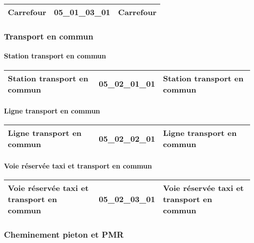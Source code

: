 \documentclass[12pt,titlepage]{book}
\begin{document}
\renewcommand{\arraystretch}{1.2}
\begin{supertabular}{|p{10cm}|c|p{15cm}|}
 Carrefour & 05\_01\_03\_01 & Carrefour\\
\hline
\end{supertabular}

\subsubsection{\large Transport en commun}
\paragraph{Station transport en commun}
\noindent
\vspace{\baselineskip}

\renewcommand{\arraystretch}{1.2}
\begin{supertabular}{|p{10cm}|c|p{15cm}|}
 Station transport en commun & 05\_02\_01\_01 & Station transport en commun\\
\hline
\end{supertabular}


\paragraph{Ligne transport en commun}
\noindent
\vspace{\baselineskip}

\renewcommand{\arraystretch}{1.2}
\begin{supertabular}{|p{10cm}|c|p{15cm}|}
 Ligne transport en commun & 05\_02\_02\_01 & Ligne transport en commun\\
\hline
\end{supertabular}


\paragraph{Voie réservée taxi et transport en commun}
\noindent
\vspace{\baselineskip}

\renewcommand{\arraystretch}{1.2}
\begin{supertabular}{|p{10cm}|c|p{15cm}|}
 Voie réservée taxi et transport en commun & 05\_02\_03\_01 & Voie réservée taxi et transport en commun\\
\hline
\end{supertabular}

\subsubsection{\large Cheminement pieton et PMR}
\end{document}
